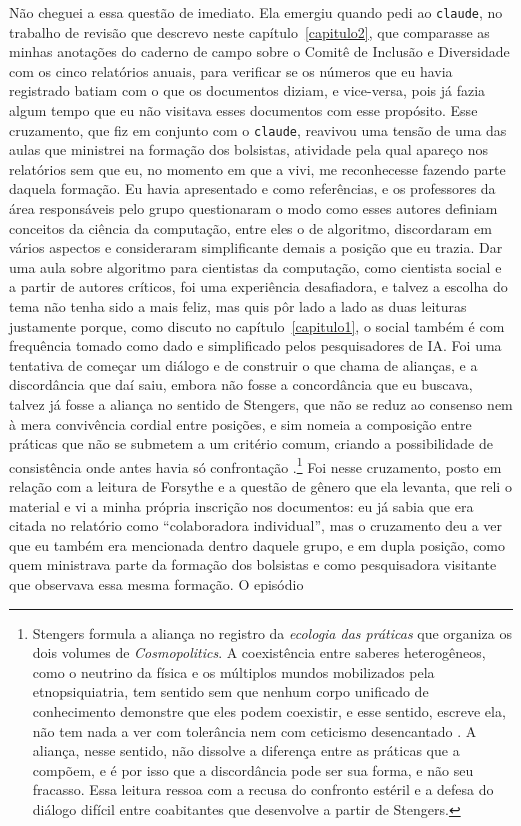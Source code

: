 Não cheguei a essa questão de imediato. Ela emergiu quando pedi ao \texttt{claude}, no trabalho de revisão que descrevo neste capítulo~\ref{capitulo2}, que comparasse as minhas anotações do caderno de campo sobre o Comitê de Inclusão e Diversidade com os cinco relatórios anuais, para verificar se os números que eu havia registrado batiam com o que os documentos diziam, e vice-versa, pois já fazia algum tempo que eu não visitava esses documentos com esse propósito. Esse cruzamento, que fiz em conjunto com o \texttt{claude}, reavivou uma tensão de uma das aulas que ministrei na formação dos bolsistas, atividade pela qual apareço nos relatórios sem que eu, no momento em que a vivi, me reconhecesse fazendo parte daquela formação. Eu havia apresentado \textcite{pasquinelli2020nooscópio} e \textcite{Crawford2018Anatomy} como referências, e os professores da área responsáveis pelo grupo questionaram o modo como esses autores definiam conceitos da ciência da computação, entre eles o de algoritmo, discordaram em vários aspectos e consideraram simplificante demais a posição que eu trazia. Dar uma aula sobre algoritmo para cientistas da computação, como cientista social e a partir de autores críticos, foi uma experiência desafiadora, e talvez a escolha do tema não tenha sido a mais feliz, mas quis pôr lado a lado as duas leituras justamente porque, como discuto no capítulo~\ref{capitulo1}, o social também é com frequência tomado como dado e simplificado pelos pesquisadores de IA. Foi uma tentativa de começar um diálogo e de construir o que \textcite{stengers2010cosmopolitics1} chama de alianças, e a discordância que daí saiu, embora não fosse a concordância que eu buscava, talvez já fosse a aliança no sentido de Stengers, que não se reduz ao consenso nem à mera convivência cordial entre posições, e sim nomeia a composição entre práticas que não se submetem a um critério comum, criando a possibilidade de consistência onde antes havia só confrontação \parencite[][p.~vii]{stengers2010cosmopolitics1}.\footnote{Stengers formula a aliança no registro da \textit{ecologia das práticas} que organiza os dois volumes de \textit{Cosmopolitics}. A coexistência entre saberes heterogêneos, como o neutrino da física e os múltiplos mundos mobilizados pela etnopsiquiatria, tem sentido sem que nenhum corpo unificado de conhecimento demonstre que eles podem coexistir, e esse sentido, escreve ela, não tem nada a ver com tolerância nem com ceticismo desencantado \parencite[p.~vii]{stengers2010cosmopolitics1}. A aliança, nesse sentido, não dissolve a diferença entre as práticas que a compõem, e é por isso que a discordância pode ser sua forma, e não seu fracasso. Essa leitura ressoa com a recusa do confronto estéril e a defesa do diálogo difícil entre coabitantes que \textcite[p.~314]{costa2024manchando} desenvolve a partir de Stengers.} Foi nesse cruzamento, posto em relação com a leitura de Forsythe e a questão de gênero que ela levanta, que reli o material e vi a minha própria inscrição nos documentos: eu já sabia que era citada no relatório como \enquote{colaboradora individual}, mas o cruzamento deu a ver que eu também era mencionada dentro daquele grupo, e em dupla posição, como quem ministrava parte da formação dos bolsistas e como pesquisadora visitante que observava essa mesma formação. O episódio 